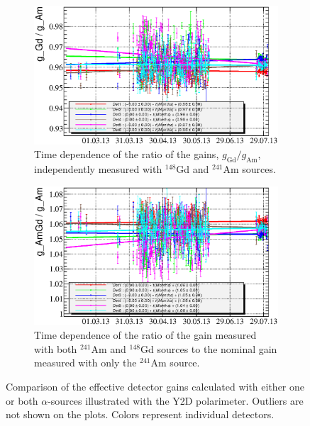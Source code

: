 \documentclass[a4paper,12pt]{article}
\newcommand\americium{${}^{241}$Am}
\newcommand\gadolinium{${}^{148}$Gd}
\begin{document}
\newcommand\gainrealationslabel{Comparison of the effective detector gains
calculated with either one or both $\alpha$-sources illustrated with the Y2D
polarimeter. Outliers are not shown on the plots. Colors represent individual
detectors.}
\begin{figure}[p]
%
\begin{subfigure}[t]{0.49\textwidth}
\includegraphics[width=\textwidth]{gfx/run13_alpha_study/Y2U/c_chGdGain_over_AmGain_by_day_Y2U.eps}
\caption{Time dependence of the ratio of the gains, $g_\text{Gd}/g_\text{Am}$,
independently measured with \gadolinium{} and \americium{} sources.}
\end{subfigure}
%
\hfill
%
\begin{subfigure}[t]{0.49\textwidth}
\includegraphics[width=\textwidth]{gfx/run13_alpha_study/Y2U/c_chAmGdGain_over_AmGain_by_day_Y2U.eps}
\caption{Time dependence of the ratio of the gain measured with both \americium{} and
\gadolinium{} sources to the nominal gain measured with only the \americium{}
source.}
\end{subfigure}
%
\caption{\gainrealationslabel}
\label{fig:gain_relations}
\end{figure}
\end{document}
